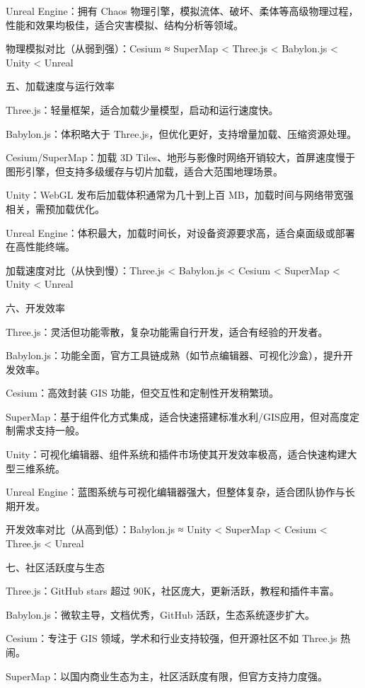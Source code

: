 Unreal Engine：拥有 Chaos 物理引擎，模拟流体、破坏、柔体等高级物理过程，性能和效果均极佳，适合灾害模拟、结构分析等领域。

物理模拟对比（从弱到强）：Cesium ≈ SuperMap \textless{} Three.js \textless{} Babylon.js \textless{} Unity \textless{} Unreal

五、加载速度与运行效率

Three.js：轻量框架，适合加载少量模型，启动和运行速度快。

Babylon.js：体积略大于 Three.js，但优化更好，支持增量加载、压缩资源处理。

Cesium/SuperMap：加载 3D Tiles、地形与影像时网络开销较大，首屏速度慢于图形引擎，但支持多级缓存与切片加载，适合大范围地理场景。

Unity：WebGL 发布后加载体积通常为几十到上百 MB，加载时间与网络带宽强相关，需预加载优化。

Unreal Engine：体积最大，加载时间长，对设备资源要求高，适合桌面级或部署在高性能终端。

加载速度对比（从快到慢）：Three.js \textless{} Babylon.js \textless{} Cesium \textless{} SuperMap \textless{} Unity \textless{} Unreal

六、开发效率

Three.js：灵活但功能零散，复杂功能需自行开发，适合有经验的开发者。

Babylon.js：功能全面，官方工具链成熟（如节点编辑器、可视化沙盒），提升开发效率。

Cesium：高效封装 GIS 功能，但交互性和定制性开发稍繁琐。

SuperMap：基于组件化方式集成，适合快速搭建标准水利/GIS应用，但对高度定制需求支持一般。

Unity：可视化编辑器、组件系统和插件市场使其开发效率极高，适合快速构建大型三维系统。

Unreal Engine：蓝图系统与可视化编辑器强大，但整体复杂，适合团队协作与长期开发。

开发效率对比（从高到低）：Babylon.js ≈ Unity \textless{} SuperMap \textless{} Cesium \textless{} Three.js \textless{} Unreal

七、社区活跃度与生态

Three.js：GitHub stars 超过 90K，社区庞大，更新活跃，教程和插件丰富。

Babylon.js：微软主导，文档优秀，GitHub 活跃，生态系统逐步扩大。

Cesium：专注于 GIS 领域，学术和行业支持较强，但开源社区不如 Three.js 热闹。

SuperMap：以国内商业生态为主，社区活跃度有限，但官方支持力度强。

